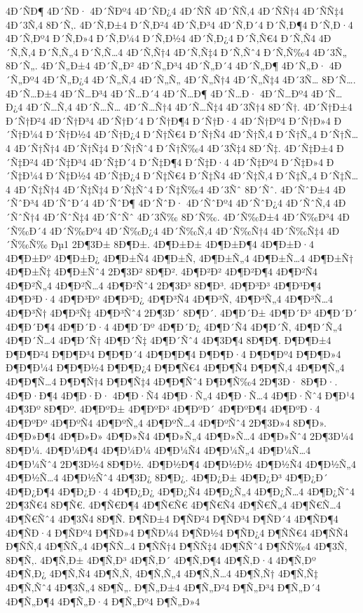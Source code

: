 {4Ð´ÑÐ¶
4Ð´ÑÐ·
4Ð´ÑÐº4
4Ð´ÑÐ¿4
4Ð´ÑÑ
4Ð´ÑÑ‚4
4Ð´ÑÑ†4
4Ð´ÑÑ‡4
4Ð´3Ñ‚4
8Ð´Ñ‚.
4Ð´Ñ‚Ð±4
Ð´Ñ‚Ð²4
4Ð´Ñ‚Ð³4
4Ð´Ñ‚Ð´4
Ð´Ñ‚Ð¶4
Ð´Ñ‚Ð·4
4Ð´Ñ‚Ðº4
Ð´Ñ‚Ð»4
Ð´Ñ‚Ð¼4
Ð´Ñ‚Ð½4
4Ð´Ñ‚Ð¿4
Ð´Ñ‚Ñ€4
Ð´Ñ‚Ñ4
4Ð´Ñ‚Ñ‚4
Ð´Ñ‚Ñ„4
Ð´Ñ‚Ñ…4
4Ð´Ñ‚Ñ†4
4Ð´Ñ‚Ñ‡4
Ð´Ñ‚Ñˆ4
Ð´Ñ‚Ñ‰4
4Ð´3Ñ„
8Ð´Ñ„.
4Ð´Ñ„Ð±4
4Ð´Ñ„Ð²
4Ð´Ñ„Ð³4
4Ð´Ñ„Ð´4
4Ð´Ñ„Ð¶
4Ð´Ñ„Ð·
4Ð´Ñ„Ðº4
4Ð´Ñ„Ð¿4
4Ð´Ñ„Ñ‚4
4Ð´Ñ„Ñ„
4Ð´Ñ„Ñ†4
4Ð´Ñ„Ñ‡4
4Ð´3Ñ…
8Ð´Ñ….
4Ð´Ñ…Ð±4
4Ð´Ñ…Ð³4
4Ð´Ñ…Ð´4
4Ð´Ñ…Ð¶
4Ð´Ñ…Ð·
4Ð´Ñ…Ðº4
4Ð´Ñ…Ð¿4
4Ð´Ñ…Ñ‚4
4Ð´Ñ…Ñ…
4Ð´Ñ…Ñ†4
4Ð´Ñ…Ñ‡4
4Ð´3Ñ†4
8Ð´Ñ†.
4Ð´Ñ†Ð±4
Ð´Ñ†Ð²4
4Ð´Ñ†Ð³4
4Ð´Ñ†Ð´4
Ð´Ñ†Ð¶4
Ð´Ñ†Ð·4
4Ð´Ñ†Ðº4
Ð´Ñ†Ð»4
Ð´Ñ†Ð¼4
Ð´Ñ†Ð½4
4Ð´Ñ†Ð¿4
Ð´Ñ†Ñ€4
Ð´Ñ†Ñ4
4Ð´Ñ†Ñ‚4
Ð´Ñ†Ñ„4
Ð´Ñ†Ñ…4
4Ð´Ñ†Ñ†4
4Ð´Ñ†Ñ‡4
Ð´Ñ†Ñˆ4
Ð´Ñ†Ñ‰4
4Ð´3Ñ‡4
8Ð´Ñ‡.
4Ð´Ñ‡Ð±4
Ð´Ñ‡Ð²4
4Ð´Ñ‡Ð³4
4Ð´Ñ‡Ð´4
Ð´Ñ‡Ð¶4
Ð´Ñ‡Ð·4
4Ð´Ñ‡Ðº4
Ð´Ñ‡Ð»4
Ð´Ñ‡Ð¼4
Ð´Ñ‡Ð½4
4Ð´Ñ‡Ð¿4
Ð´Ñ‡Ñ€4
Ð´Ñ‡Ñ4
4Ð´Ñ‡Ñ‚4
Ð´Ñ‡Ñ„4
Ð´Ñ‡Ñ…4
4Ð´Ñ‡Ñ†4
4Ð´Ñ‡Ñ‡4
Ð´Ñ‡Ñˆ4
Ð´Ñ‡Ñ‰4
4Ð´3Ñˆ
8Ð´Ñˆ.
4Ð´ÑˆÐ±4
4Ð´ÑˆÐ³4
4Ð´ÑˆÐ´4
4Ð´ÑˆÐ¶
4Ð´ÑˆÐ·
4Ð´ÑˆÐº4
4Ð´ÑˆÐ¿4
4Ð´ÑˆÑ‚4
4Ð´ÑˆÑ†4
4Ð´ÑˆÑ‡4
4Ð´ÑˆÑˆ
4Ð´3Ñ‰
8Ð´Ñ‰.
4Ð´Ñ‰Ð±4
4Ð´Ñ‰Ð³4
4Ð´Ñ‰Ð´4
4Ð´Ñ‰Ðº4
4Ð´Ñ‰Ð¿4
4Ð´Ñ‰Ñ‚4
4Ð´Ñ‰Ñ†4
4Ð´Ñ‰Ñ‡4
4Ð´Ñ‰Ñ‰
Ðµ1
2Ð¶3Ð±
8Ð¶Ð±.
4Ð¶Ð±Ð±
4Ð¶Ð±Ð¶4
4Ð¶Ð±Ð·4
4Ð¶Ð±Ðº
4Ð¶Ð±Ð¿
4Ð¶Ð±Ñ4
4Ð¶Ð±Ñ‚
4Ð¶Ð±Ñ„4
4Ð¶Ð±Ñ…4
4Ð¶Ð±Ñ†
4Ð¶Ð±Ñ‡
4Ð¶Ð±Ñˆ4
2Ð¶3Ð²
8Ð¶Ð².
4Ð¶Ð²Ð²
4Ð¶Ð²Ð¶4
4Ð¶Ð²Ñ4
4Ð¶Ð²Ñ„4
4Ð¶Ð²Ñ…4
4Ð¶Ð²Ñˆ4
2Ð¶3Ð³
8Ð¶Ð³.
4Ð¶Ð³Ð³
4Ð¶Ð³Ð¶4
4Ð¶Ð³Ð·4
4Ð¶Ð³Ðº
4Ð¶Ð³Ð¿
4Ð¶Ð³Ñ4
4Ð¶Ð³Ñ‚
4Ð¶Ð³Ñ„4
4Ð¶Ð³Ñ…4
4Ð¶Ð³Ñ†
4Ð¶Ð³Ñ‡
4Ð¶Ð³Ñˆ4
2Ð¶3Ð´
8Ð¶Ð´.
4Ð¶Ð´Ð±
4Ð¶Ð´Ð³
4Ð¶Ð´Ð´
4Ð¶Ð´Ð¶4
4Ð¶Ð´Ð·4
4Ð¶Ð´Ðº
4Ð¶Ð´Ð¿
4Ð¶Ð´Ñ4
4Ð¶Ð´Ñ‚
4Ð¶Ð´Ñ„4
4Ð¶Ð´Ñ…4
4Ð¶Ð´Ñ†
4Ð¶Ð´Ñ‡
4Ð¶Ð´Ñˆ4
4Ð¶3Ð¶4
8Ð¶Ð¶.
Ð¶Ð¶Ð±4
Ð¶Ð¶Ð²4
Ð¶Ð¶Ð³4
Ð¶Ð¶Ð´4
4Ð¶Ð¶Ð¶4
Ð¶Ð¶Ð·4
Ð¶Ð¶Ðº4
Ð¶Ð¶Ð»4
Ð¶Ð¶Ð¼4
Ð¶Ð¶Ð½4
Ð¶Ð¶Ð¿4
Ð¶Ð¶Ñ€4
4Ð¶Ð¶Ñ4
Ð¶Ð¶Ñ‚4
4Ð¶Ð¶Ñ„4
4Ð¶Ð¶Ñ…4
Ð¶Ð¶Ñ†4
Ð¶Ð¶Ñ‡4
4Ð¶Ð¶Ñˆ4
Ð¶Ð¶Ñ‰4
2Ð¶3Ð·
8Ð¶Ð·.
4Ð¶Ð·Ð¶4
4Ð¶Ð·Ð·
4Ð¶Ð·Ñ4
4Ð¶Ð·Ñ„4
4Ð¶Ð·Ñ…4
4Ð¶Ð·Ñˆ4
Ð¶Ð¹4
4Ð¶3Ðº
8Ð¶Ðº.
4Ð¶ÐºÐ±
4Ð¶ÐºÐ³
4Ð¶ÐºÐ´
4Ð¶ÐºÐ¶4
4Ð¶ÐºÐ·4
4Ð¶ÐºÐº
4Ð¶ÐºÑ4
4Ð¶ÐºÑ„4
4Ð¶ÐºÑ…4
4Ð¶ÐºÑˆ4
2Ð¶3Ð»4
8Ð¶Ð».
4Ð¶Ð»Ð¶4
4Ð¶Ð»Ð»
4Ð¶Ð»Ñ4
4Ð¶Ð»Ñ„4
4Ð¶Ð»Ñ…4
4Ð¶Ð»Ñˆ4
2Ð¶3Ð¼4
8Ð¶Ð¼.
4Ð¶Ð¼Ð¶4
4Ð¶Ð¼Ð¼
4Ð¶Ð¼Ñ4
4Ð¶Ð¼Ñ„4
4Ð¶Ð¼Ñ…4
4Ð¶Ð¼Ñˆ4
2Ð¶3Ð½4
8Ð¶Ð½.
4Ð¶Ð½Ð¶4
4Ð¶Ð½Ð½
4Ð¶Ð½Ñ4
4Ð¶Ð½Ñ„4
4Ð¶Ð½Ñ…4
4Ð¶Ð½Ñˆ4
4Ð¶3Ð¿
8Ð¶Ð¿.
4Ð¶Ð¿Ð±
4Ð¶Ð¿Ð³
4Ð¶Ð¿Ð´
4Ð¶Ð¿Ð¶4
4Ð¶Ð¿Ð·4
4Ð¶Ð¿Ð¿
4Ð¶Ð¿Ñ4
4Ð¶Ð¿Ñ„4
4Ð¶Ð¿Ñ…4
4Ð¶Ð¿Ñˆ4
2Ð¶3Ñ€4
8Ð¶Ñ€.
4Ð¶Ñ€Ð¶4
4Ð¶Ñ€Ñ€
4Ð¶Ñ€Ñ4
4Ð¶Ñ€Ñ„4
4Ð¶Ñ€Ñ…4
4Ð¶Ñ€Ñˆ4
4Ð¶3Ñ4
8Ð¶Ñ.
Ð¶ÑÐ±4
Ð¶ÑÐ²4
Ð¶ÑÐ³4
Ð¶ÑÐ´4
4Ð¶ÑÐ¶4
4Ð¶ÑÐ·4
Ð¶ÑÐº4
Ð¶ÑÐ»4
Ð¶ÑÐ¼4
Ð¶ÑÐ½4
Ð¶ÑÐ¿4
Ð¶ÑÑ€4
4Ð¶ÑÑ4
Ð¶ÑÑ‚4
4Ð¶ÑÑ„4
4Ð¶ÑÑ…4
Ð¶ÑÑ†4
Ð¶ÑÑ‡4
4Ð¶ÑÑˆ4
Ð¶ÑÑ‰4
4Ð¶3Ñ‚
8Ð¶Ñ‚.
4Ð¶Ñ‚Ð±
4Ð¶Ñ‚Ð³
4Ð¶Ñ‚Ð´
4Ð¶Ñ‚Ð¶4
4Ð¶Ñ‚Ð·4
4Ð¶Ñ‚Ðº
4Ð¶Ñ‚Ð¿
4Ð¶Ñ‚Ñ4
4Ð¶Ñ‚Ñ‚
4Ð¶Ñ‚Ñ„4
4Ð¶Ñ‚Ñ…4
4Ð¶Ñ‚Ñ†
4Ð¶Ñ‚Ñ‡
4Ð¶Ñ‚Ñˆ4
4Ð¶3Ñ„4
8Ð¶Ñ„.
Ð¶Ñ„Ð±4
4Ð¶Ñ„Ð²4
Ð¶Ñ„Ð³4
Ð¶Ñ„Ð´4
4Ð¶Ñ„Ð¶4
4Ð¶Ñ„Ð·4
Ð¶Ñ„Ðº4
Ð¶Ñ„Ð»4
}
